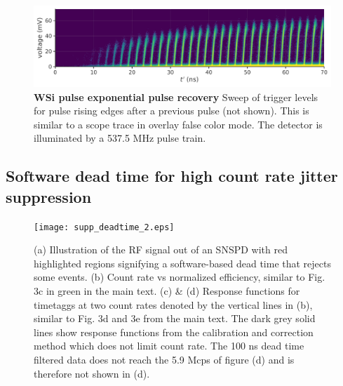 \documentclass[11pt]{caltech_thesis} %
\begin{document}
\hypertarget{fig:rise_exp}{%
\begin{figure}
\centering
\includegraphics[width=1\textwidth,height=\textheight]{chapter_02/figs_02/rise_exp_light.pdf}
\caption[{WSi pulse exponential pulse recovery}]{\textbf{WSi pulse exponential pulse recovery} Sweep of trigger levels for pulse rising edges after a previous pulse (not shown). This is similar to a scope trace in overlay false color mode. The detector is illuminated by a 537.5 MHz pulse train.}
\label{fig:rise_exp}
\end{figure}
}

\hypertarget{software-dead-time-for-high-count-rate-jitter-suppression}{%
\subsection{Software dead time for high count rate jitter suppression}\label{software-dead-time-for-high-count-rate-jitter-suppression}}

\begin{figure}
    \centering
    \texttt{[image: supp\_deadtime\_2.eps]}
    \label{fig:dead_time}
    \caption{(a) Illustration of the RF signal out of an SNSPD with red highlighted regions signifying a software-based dead time that rejects some events. (b) Count rate vs normalized efficiency, similar to Fig. 3c in green in the main text. (c) \& (d) Response functions for timetaggs at two count rates denoted by the vertical lines in (b), similar to Fig. 3d and 3e from the main text. The dark grey solid lines show response functions from the calibration and correction method which does not limit count rate. The 100 ns dead time filtered data does not reach the 5.9 Mcps of figure (d) and is therefore not shown in (d).}
\end{figure}
\end{document}
